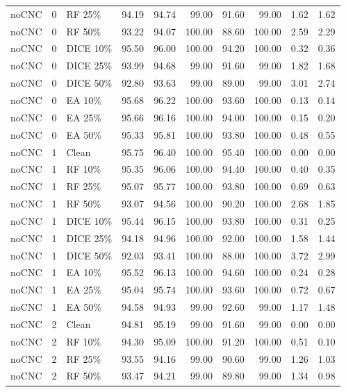 {\begin{longtable}{rllrrrrrrr}
noCNC & 0 & RF 25\% & 94.19 & 94.74 & 99.00 & 91.60 & 99.00 & 1.62 & 1.62 \\
noCNC & 0 & RF 50\% & 93.22 & 94.07 & 100.00 & 88.60 & 100.00 & 2.59 & 2.29 \\
noCNC & 0 & DICE 10\% & 95.50 & 96.00 & 100.00 & 94.20 & 100.00 & 0.32 & 0.36 \\
noCNC & 0 & DICE 25\% & 93.99 & 94.68 & 99.00 & 91.60 & 99.00 & 1.82 & 1.68 \\
noCNC & 0 & DICE 50\% & 92.80 & 93.63 & 99.00 & 89.00 & 99.00 & 3.01 & 2.74 \\
noCNC & 0 & EA 10\% & 95.68 & 96.22 & 100.00 & 93.60 & 100.00 & 0.13 & 0.14 \\
noCNC & 0 & EA 25\% & 95.66 & 96.16 & 100.00 & 94.00 & 100.00 & 0.15 & 0.20 \\
noCNC & 0 & EA 50\% & 95.33 & 95.81 & 100.00 & 93.80 & 100.00 & 0.48 & 0.55 \\
noCNC & 1 & Clean & 95.75 & 96.40 & 100.00 & 95.40 & 100.00 & 0.00 & 0.00 \\
noCNC & 1 & RF 10\% & 95.35 & 96.06 & 100.00 & 94.40 & 100.00 & 0.40 & 0.35 \\
noCNC & 1 & RF 25\% & 95.07 & 95.77 & 100.00 & 93.80 & 100.00 & 0.69 & 0.63 \\
noCNC & 1 & RF 50\% & 93.07 & 94.56 & 100.00 & 90.20 & 100.00 & 2.68 & 1.85 \\
noCNC & 1 & DICE 10\% & 95.44 & 96.15 & 100.00 & 93.80 & 100.00 & 0.31 & 0.25 \\
noCNC & 1 & DICE 25\% & 94.18 & 94.96 & 100.00 & 92.00 & 100.00 & 1.58 & 1.44 \\
noCNC & 1 & DICE 50\% & 92.03 & 93.41 & 100.00 & 88.00 & 100.00 & 3.72 & 2.99 \\
noCNC & 1 & EA 10\% & 95.52 & 96.13 & 100.00 & 94.60 & 100.00 & 0.24 & 0.28 \\
noCNC & 1 & EA 25\% & 95.04 & 95.74 & 100.00 & 93.60 & 100.00 & 0.72 & 0.67 \\
noCNC & 1 & EA 50\% & 94.58 & 94.93 & 99.00 & 92.60 & 99.00 & 1.17 & 1.48 \\
noCNC & 2 & Clean & 94.81 & 95.19 & 99.00 & 91.60 & 99.00 & 0.00 & 0.00 \\
noCNC & 2 & RF 10\% & 94.30 & 95.09 & 100.00 & 91.20 & 100.00 & 0.51 & 0.10 \\
noCNC & 2 & RF 25\% & 93.55 & 94.16 & 99.00 & 90.60 & 99.00 & 1.26 & 1.03 \\
noCNC & 2 & RF 50\% & 93.47 & 94.21 & 99.00 & 89.80 & 99.00 & 1.34 & 0.98 \\

\end{longtable}}
